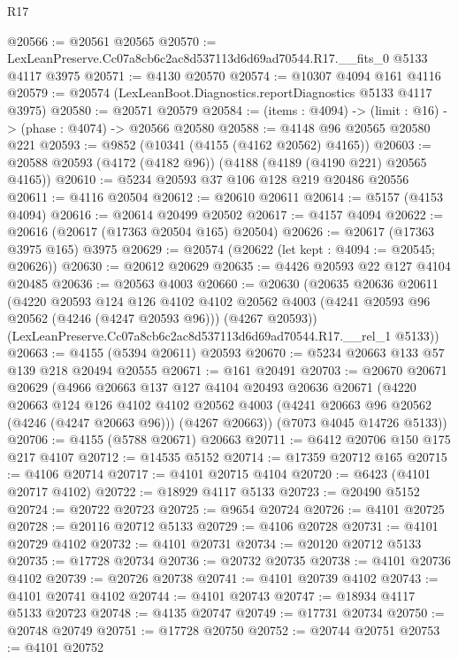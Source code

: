 \begin{lexlean}{R17}
\begin{coremodule}
@20566 := @20561 @20565
@20570 := LexLeanPreserve.Cc07a8cb6c2ac8d537113d6d69ad70544.R17.__fits_0 @5133 @4117 @3975
@20571 := @4130 @20570
@20574 := @10307 @4094 @161 @4116
@20579 := @20574 (LexLeanBoot.Diagnostics.reportDiagnostics @5133 @4117 @3975)
@20580 := @20571 @20579
@20584 := (items : @4094) -> (limit : @16) -> (phase : @4074) -> @20566 @20580
@20588 := @4148 @96 @20565 @20580 @221
@20593 := @9852 (@10341 (@4155 (@4162 @20562) @4165))
@20603 := @20588 @20593 (@4172 (@4182 @96)) (@4188 (@4189 (@4190 @221) @20565 @4165))
@20610 := @5234 @20593 @37 @106 @128 @219 @20486 @20556
@20611 := @4116 @20504
@20612 := @20610 @20611
@20614 := @5157 (@4153 @4094)
@20616 := @20614 @20499 @20502
@20617 := @4157 @4094
@20622 := @20616 (@20617 (@17363 @20504 @165) @20504)
@20626 := @20617 (@17363 @3975 @165) @3975
@20629 := @20574 (@20622 (let kept : @4094 := @20545; @20626))
@20630 := @20612 @20629
@20635 := @4426 @20593 @22 @127 @4104 @20485
@20636 := @20563 @4003
@20660 := @20630
    (@20635
      @20636
      @20611
      (@4220
        @20593
        @124
        @126
        @4102
        @4102
        @20562
        @4003
        (@4241 @20593 @96 @20562 (@4246 (@4247 @20593 @96)))
        (@4267 @20593))
      (LexLeanPreserve.Cc07a8cb6c2ac8d537113d6d69ad70544.R17.__rel_1 @5133))
@20663 := @4155 (@5394 @20611) @20593
@20670 := @5234 @20663 @133 @57 @139 @218 @20494 @20555
@20671 := @161 @20491
@20703 := @20670
    @20671
    @20629
    (@4966
      @20663
      @137
      @127
      @4104
      @20493
      @20636
      @20671
      (@4220
        @20663
        @124
        @126
        @4102
        @4102
        @20562
        @4003
        (@4241 @20663 @96 @20562 (@4246 (@4247 @20663 @96)))
        (@4267 @20663))
      (@7073 @4045 @14726 @5133))
@20706 := @4155 (@5788 @20671) @20663
@20711 := @6412 @20706 @150 @175 @217 @4107
@20712 := @14535 @5152
@20714 := @17359 @20712 @165
@20715 := @4106 @20714
@20717 := @4101 @20715 @4104
@20720 := @6423 (@4101 @20717 @4102)
@20722 := @18929 @4117 @5133
@20723 := @20490 @5152
@20724 := @20722 @20723
@20725 := @9654 @20724
@20726 := @4101 @20725
@20728 := @20116 @20712 @5133
@20729 := @4106 @20728
@20731 := @4101 @20729 @4102
@20732 := @4101 @20731
@20734 := @20120 @20712 @5133
@20735 := @17728 @20734
@20736 := @20732 @20735
@20738 := @4101 @20736 @4102
@20739 := @20726 @20738
@20741 := @4101 @20739 @4102
@20743 := @4101 @20741 @4102
@20744 := @4101 @20743
@20747 := @18934 @4117 @5133 @20723
@20748 := @4135 @20747
@20749 := @17731 @20734
@20750 := @20748 @20749
@20751 := @17728 @20750
@20752 := @20744 @20751
@20753 := @4101 @20752

\end{coremodule}
\end{lexlean}
